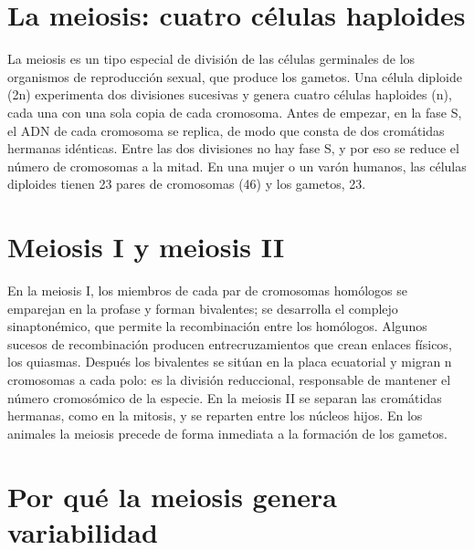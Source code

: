 \documentclass{book}
\begin{document}

\section{La meiosis: cuatro células haploides}

La meiosis es un tipo especial de división de las células germinales de los organismos de reproducción sexual, que produce los gametos. Una célula diploide (2n) experimenta dos divisiones sucesivas y genera cuatro células haploides (n), cada una con una sola copia de cada cromosoma. Antes de empezar, en la fase S, el ADN de cada cromosoma se replica, de modo que consta de dos cromátidas hermanas idénticas. Entre las dos divisiones no hay fase S, y por eso se reduce el número de cromosomas a la mitad. En una mujer o un varón humanos, las células diploides tienen 23 pares de cromosomas (46) y los gametos, 23.


\section{Meiosis I y meiosis II}

En la meiosis I, los miembros de cada par de cromosomas homólogos se emparejan en la profase y forman bivalentes; se desarrolla el complejo sinaptonémico, que permite la recombinación entre los homólogos. Algunos sucesos de recombinación producen entrecruzamientos que crean enlaces físicos, los quiasmas. Después los bivalentes se sitúan en la placa ecuatorial y migran n cromosomas a cada polo: es la división reduccional, responsable de mantener el número cromosómico de la especie. En la meiosis II se separan las cromátidas hermanas, como en la mitosis, y se reparten entre los núcleos hijos. En los animales la meiosis precede de forma inmediata a la formación de los gametos.


\section{Por qué la meiosis genera variabilidad}
\end{document}
